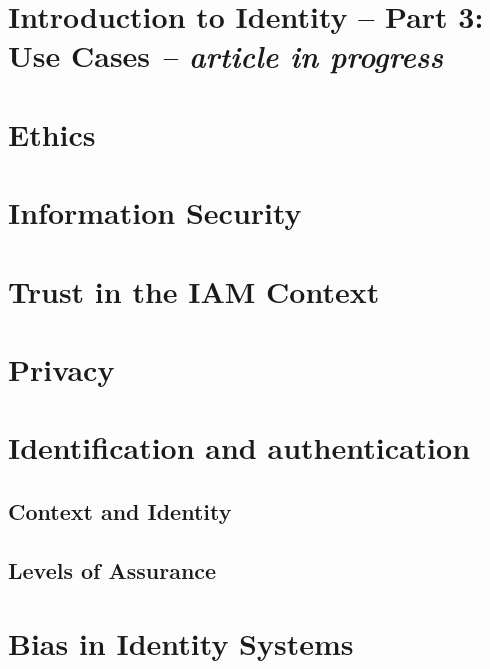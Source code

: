 \hypertarget{introduction-to-identity-part-3-use-cases-article-in-progress}{%
\section{\texorpdfstring{Introduction to Identity -- Part 3: Use
Cases \emph{-- article in
progress}}{Introduction to Identity -- Part 3: Use Cases -- article in progress}}\label{introduction-to-identity-part-3-use-cases-article-in-progress}}

\hypertarget{ethics}{%
\section{Ethics }\label{ethics}}

\hypertarget{information-security}{%
\section{Information Security}\label{information-security}}

\hypertarget{trust-in-the-iam-context}{%
\section{Trust in the IAM Context}\label{trust-in-the-iam-context}}

\hypertarget{privacy}{%
\section{Privacy}\label{privacy}}

\hypertarget{identification-and-authentication}{%
\section{Identification and
authentication}\label{identification-and-authentication}}

\hypertarget{context-and-identity}{%
\subsection{Context and Identity}\label{context-and-identity}}

\hypertarget{levels-of-assurance}{%
\subsection{Levels of Assurance}\label{levels-of-assurance}}

\hypertarget{bias-in-identity-systems}{%
\section{Bias in Identity Systems}\label{bias-in-identity-systems}}

